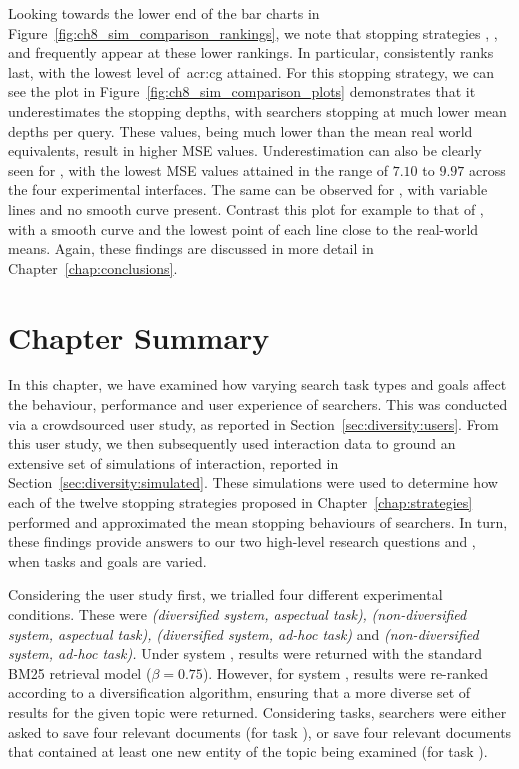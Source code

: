 Looking towards the lower end of the bar charts in Figure~\ref{fig:ch8_sim_comparison_rankings}, we note that stopping strategies , ,  and  frequently appear at these lower rankings. In particular,  consistently ranks last, with the lowest level of~\gls{acr:cg} attained. For this stopping strategy, we can see the plot in Figure~\ref{fig:ch8_sim_comparison_plots} demonstrates that it underestimates the stopping depths, with searchers stopping at much lower mean depths per query. These values, being much lower than the mean real world equivalents, result in higher MSE values. Underestimation can also be clearly seen for , with the lowest MSE values attained in the range of $7.10$ to $9.97$ across the four experimental interfaces. The same can be observed for , with variable lines and no smooth curve present. Contrast this plot for example to that of , with a smooth curve and the lowest point of each line close to the real-world means. Again, these findings are discussed in more detail in Chapter~\ref{chap:conclusions}.

\section{Chapter Summary}
In this chapter, we have examined how varying search task types and goals affect the behaviour, performance and user experience of searchers. This was conducted via a crowdsourced user study, as reported in Section~\ref{sec:diversity:users}. From this user study, we then subsequently used interaction data to ground an extensive set of simulations of interaction, reported in Section~\ref{sec:diversity:simulated}. These simulations were used to determine how each of the twelve stopping strategies proposed in Chapter~\ref{chap:strategies} performed and approximated the mean stopping behaviours of searchers. In turn, these findings provide answers to our two high-level research questions  and , when tasks and goals are varied.

Considering the user study first, we trialled four different experimental conditions. These were  \emph{(diversified system, aspectual task),}  \emph{(non-diversified system, aspectual task),}  \emph{(diversified system, ad-hoc task)} and  \emph{(non-diversified system, ad-hoc task).} Under system , results were returned with the standard BM25 retrieval model ($\beta=0.75$). However, for system , results were re-ranked according to a diversification algorithm, ensuring that a more diverse set of results for the given topic were returned. Considering tasks, searchers were either asked to save four relevant documents (for task ), or save four relevant documents that contained at least one new entity of the topic being examined (for task ).

